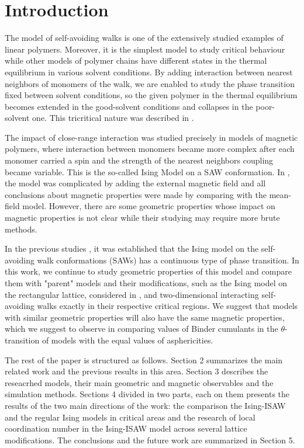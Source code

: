 \section{Introduction}

The model of self-avoiding walks is one of the extensively studied examples of linear polymers. 
Moreover, it is the simplest model to study critical behaviour while other models of polymer chains have different states in the thermal equilibrium in various solvent conditions. 
By adding interaction between nearest neighbors of monomers of the walk, we are enabled to study the phase transition fixed between solvent conditions, so the given polymer in the thermal equilibrium becomes extended in the good-solvent conditions and collapses in the poor-solvent one. 
This tricritical nature was described in \cite{Gennes1979}.

The impact of close-range interaction was studied precisely in models of magnetic polymers, where interaction between monomers became more complex after each monomer carried a spin and the strength of the nearest neighbors coupling became variable. 
This is the so-called Ising Model on a SAW conformation. 
In \cite{Garel1999}, the model was complicated by adding the external magnetic field and all conclusions about magnetic properties were made by comparing with the mean-field model. 
However, there are some geometric properties whose impact on magnetic properties is not clear while their studying may require more brute methods.

In the previous studies \cite{faizullina2021critical}, it was established that the Ising model on the self-avoiding walk conformations (SAWs) has a continuous type of phase transition. 
In this work, we continue to study geometric properties of this model and compare them with "parent" models and their modifications, such as the Ising model on the rectangular lattice, considered in \cite{Selke2006}, and two-dimensional interacting self-avoiding walks exactly in their respective critical regions. 
We suggest that models with similar geometric properties will also have the same magnetic properties, which we suggest to observe in comparing values of Binder cumulants in the $\theta$-transition of models with the equal values of asphericities.

The rest of the paper is structured as follows. 
Section 2 summarizes the main related work and the previous results in this area. 
Section 3 describes the reseacrhed models, their main geometric and magnetic observables and the simulation methods. 
Sections 4 divided in two parts, each on them presents the results of the two main directions of the work: the comparison the Ising-ISAW and the regular Ising models in critical areas and the research of local coordination number in the Ising-ISAW model across several lattice modifications.
The conclusions and the future work are summarized in Section 5.